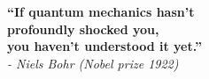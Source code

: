\pagebreak
\hspace{0pt}
\vfill
\begin{flushleft}
    \textbf{\enquote{If quantum mechanics hasn't \\
    profoundly shocked you, \\
    you haven't understood it yet.}}\\
    \hspace{3cm} \textit{- Niels Bohr (Nobel prize 1922)}
\end{flushleft}
\vfill
\hspace{0pt}
\pagebreak
\newpage